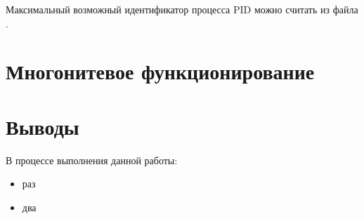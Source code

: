 Максимальный возможный идентификатор процесса PID можно считать из файла .


\section{Многонитевое функционирование}

\section{Выводы}

В процессе выполнения данной работы:
\begin{itemize}
	\item раз
	\item два
\end{itemize}



